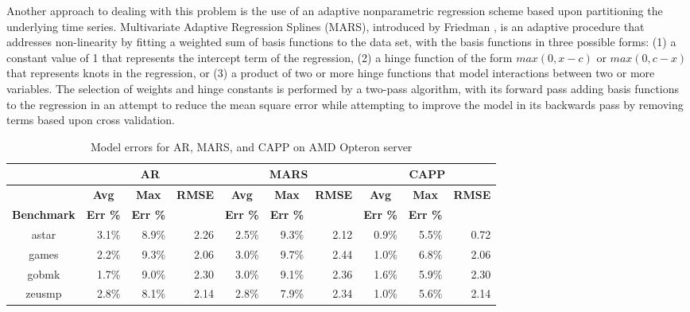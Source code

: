 \documentclass[times,10pt,finalversion]{usetex-v1}
\begin{document}
Another approach to dealing with this problem is the use of an adaptive
nonparametric regression scheme based upon partitioning the underlying
time series.  Multivariate Adaptive Regression Splines (MARS),
introduced by Friedman \cite{Friedman1991}, is an adaptive procedure
that addresses non-linearity by fitting a weighted sum of basis
functions to the data set, with the basis functions in three possible forms:
(1) a constant value of 1 that represents the intercept term of the
regression, (2) a hinge function of the form $max(0,x-c)$ or
$max(0,c-x)$ that represents knots in the regression, or (3) a product
of two or more hinge functions that model interactions between two or
more variables.  The selection of weights and hinge constants is
performed by a two-pass algorithm, with its forward pass adding basis
functions to the regression in an attempt to reduce the mean square
error while attempting to improve the model in its backwards pass by
removing terms based upon cross validation.
\begin{small}
\begin{table}[tbp]
  \centering
    \caption{Model errors for AR, MARS, and CAPP on AMD Opteron server}
    \label{tab:modelerroropt}
    \begin{tabular}[phtb]{c |r r r|r r r|r r r}
      \hline
      \multicolumn{1}{c|}{}&\multicolumn{3}{c|}{\textbf{AR}}&\multicolumn{3}{c|}{\textbf{MARS}}&\multicolumn{3}{c}{\textbf{CAPP}}\\
        \hline
  &\multicolumn{1}{c}{\textbf{Avg}}&\multicolumn{1}{c}{\textbf{Max}}&\multicolumn{1}{c|}{\textbf{RMSE}}&\multicolumn{1}{c}{\textbf{Avg}}&\multicolumn{1}{c}{\textbf{Max}}&\multicolumn{1}{c|}{\textbf{RMSE}}&\multicolumn{1}{c}{\textbf{Avg}}&\multicolumn{1}{c}{\textbf{Max}}&\multicolumn{1}{c}{\textbf{RMSE}}\\
\multicolumn{1}{c|}{\textbf{Benchmark}}&\multicolumn{1}{c}{\textbf{Err \%}}&\multicolumn{1}{c}{\textbf{Err \%}}&\multicolumn{1}{c|}{}&\multicolumn{1}{c}{\textbf{Err \%}}&\multicolumn{1}{c}{\textbf{Err \%}}&\multicolumn{1}{c|}{\textbf{}}&\multicolumn{1}{c}{\textbf{Err \%}}&\multicolumn{1}{c}{\textbf{Err \%}}&\multicolumn{1}{c}{}\\
      \hline      
      astar &3.1\%&8.9\%&2.26&2.5\%&9.3\%&2.12&0.9\%&5.5\%&0.72\\
      games &2.2\%&9.3\%&2.06&3.0\%&9.7\%&2.44&1.0\%&6.8\%&2.06\\
      gobmk &1.7\%&9.0\%&2.30&3.0\%&9.1\%&2.36&1.6\%&5.9\%&2.30\\
      zeusmp&2.8\%&8.1\%&2.14&2.8\%&7.9\%&2.34&1.0\%&5.6\%&2.14\\
      \hline
    \end{tabular}
  \end{table}
\end{small}
\end{document}
